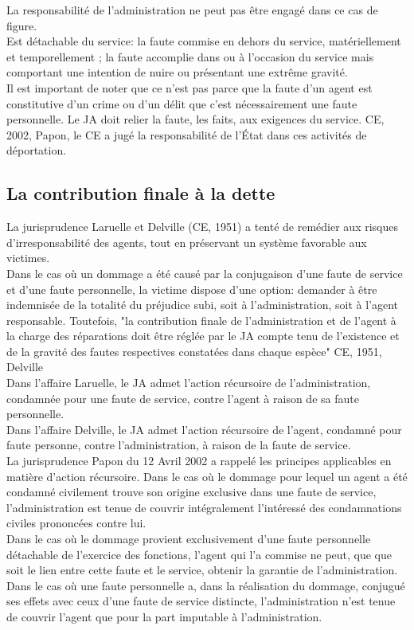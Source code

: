 \documentclass[10pt, a4paper, openany]{book}
\begin{document}
La responsabilité de l'administration ne peut pas être engagé dans ce cas de figure. \\
Est détachable du service: la faute commise en dehors du service, matériellement et temporellement ; la faute accomplie dans ou à l'occasion du service mais comportant une intention de nuire ou présentant une extrême gravité. \\
Il est important de noter que ce n'est pas parce que la faute d'un agent est constitutive d'un crime ou d'un délit que c'est nécessairement une faute personnelle. Le JA doit relier la faute, les faits, aux exigences du service. CE, 2002, Papon, le CE a jugé la responsabilité de l'État dans ces activités de déportation. 

\subsection{La contribution finale à la dette}

La jurisprudence Laruelle et Delville (CE, 1951) a tenté de remédier aux risques d'irresponsabilité des agents, tout en préservant un système favorable aux victimes. \\
Dans le cas où un dommage a été causé par la conjugaison d'une faute de service et d'une faute personnelle, la victime dispose d'une option: demander à être indemnisée de la totalité du préjudice subi, soit à l'administration, soit à l'agent responsable. Toutefois, "la contribution finale de l'administration et de l'agent à la charge des réparations doit être réglée par le JA compte tenu de l'existence et de la gravité des fautes respectives constatées dans chaque espèce" CE, 1951, Delville \\
Dans l'affaire Laruelle, le JA admet l'action récursoire de l'administration, condamnée pour une faute de service, contre l'agent à raison de sa faute personnelle. \\
Dans l'affaire Delville, le JA admet l'action récursoire de l'agent, condamné pour faute personne, contre l'administration, à raison de la faute de service. \\
La jurisprudence Papon du 12 Avril 2002 a rappelé les principes applicables en matière d'action récursoire. Dans le cas où le dommage pour lequel un agent a été condamné civilement trouve son origine exclusive dans une faute de service, l'administration est tenue de couvrir intégralement l'intéressé des condamnations civiles prononcées contre lui. \\
Dans le cas où le dommage provient exclusivement d'une faute personnelle détachable de l'exercice des fonctions, l'agent qui l'a commise ne peut, que que soit le lien entre cette faute et le service, obtenir la garantie de l'administration. \\
Dans le cas où une faute personnelle a, dans la réalisation du dommage, conjugué ses effets avec ceux d'une faute de service distincte, l'administration n'est tenue de couvrir l'agent que pour la part imputable à l'administration.
\end{document}
